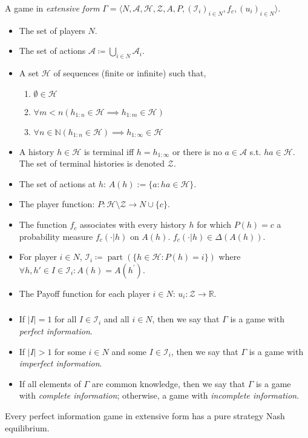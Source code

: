 \documentclass[UTF8,11pt,colorlinks,compress,openany]{beamer}%
\begin{document}
\begin{frame}\frametitle{}
\begin{definition}
	A game in \emph{extensive form} $\Gamma=\langle N,\mathcal{A},\mathcal{H},\mathcal{Z},A,P,(\mathcal{I}_i)_{i\in N},f_c,(u_i)_{i\in N}\rangle$.
	\begin{itemize}
		\item The set of players $N$.
		\item The set of actions $\mathcal{A}\coloneqq\bigcup_{i\in N}\mathcal{A}_i$.
		\item A set $\mathcal{H}$ of sequences (finite or infinite) such that,
		\begin{enumerate}
			\item $\emptyset\in \mathcal{H}$
			\item $\forall m<n\left(h_{1:n}\in \mathcal{H}\implies h_{1:m}\in \mathcal{H}\right)$
			\item $\forall n\in\mathbb N\left(h_{1:n}\in \mathcal{H}\right)\implies h_{1:\infty}\in \mathcal{H}$
		\end{enumerate}
		\item A history $h\in \mathcal{H}$ is terminal iff $h=h_{1:\infty}$ or there is no $a\in \mathcal{A}$ s.t. $ha\in \mathcal{H}$. The set of terminal histories is denoted $\mathcal{Z}$.
		\item The set of actions at $h$: $A(h):=\{a:ha\in \mathcal{H}\}$.
		\item The player function: $P:\mathcal{H}\setminus \mathcal{Z}\to N\cup\{c\}$.
		\item The function $f_c$ associates with every history $h$ for which $P(h)=c$ a probability measure $f_c(\cdot|h)$ on $A(h)$. $f_c(\cdot|h)\in\Delta(A(h))$.
		\item For player $i\in N$, $\mathcal{I}_i\coloneqq \operatorname{part}(\{h\in \mathcal{H}:P(h)=i\})$ where $\forall h,h'\in I\in\mathcal{I}_i: A(h)=A(h^\prime)$.
		\item The Payoff function for each player $i\in N$: $u_i: \mathcal{Z}\to\mathbb R$.
	\end{itemize}
\end{definition}
\end{frame}

\begin{frame}\frametitle{}
\begin{itemize}
	\item If $|I|=1$ for all $I\in\mathcal{I}_i$ and all $i\in N$, then we say that $\Gamma$ is a game with \emph{perfect information}.
	\item If $|I|>1$ for some $i\in N$ and some $I\in\mathcal{I}_i$, then we say that $\Gamma$ is a game with \emph{imperfect information}.
	\item If all elements of $\Gamma$ are common knowledge, then we say that $\Gamma$ is a game with \emph{complete information}; otherwise, a game with \emph{incomplete information}.
\end{itemize}
\begin{theorem}
Every perfect information game in extensive form has a pure strategy Nash equilibrium.
\end{theorem}
\end{frame}
\end{document}
